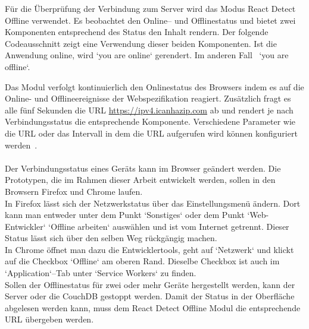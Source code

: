 Für die Überprüfung der Verbindung zum Server wird das Modus React Detect Offline verwendet. Es beobachtet den Online-- und Offlinestatus und bietet zwei Komponenten entsprechend des Status den Inhalt rendern. Der folgende Codeausschnitt zeigt eine Verwendung dieser beiden Komponenten. Ist die Anwendung online, wird `you are online` gerendert. Im anderen Fall ~`you are offline`.
%
\begin{center}

\end{center}
%
Das Modul verfolgt kontinuierlich den Onlinestatus des Browsers indem es auf die Online- und Offlineereignisse der Webspezifikation reagiert. Zusätzlich fragt es alle fünf Sekunden die URL \url{https://ipv4.icanhazip.com} ab und rendert je nach Verbindungsstatus die entsprechende Komponente. Verschiedene Parameter wie die URL oder das Intervall in dem die URL aufgerufen wird können konfiguriert werden~\cite{react-detect}. \\\\
%
Der Verbindungsstatus eines Geräts kann im Browser geändert werden. Die Prototypen, die im Rahmen dieser Arbeit entwickelt werden, sollen in den Browsern Firefox und Chrome laufen.\\
In Firefox lässt sich der Netzwerkstatus über das Einstellungsmenü ändern. Dort kann man entweder unter dem Punkt `Sonstiges` oder dem Punkt `Web-Entwickler` `Offline arbeiten` auswählen und ist vom Internet getrennt. Dieser Status lässt sich über den selben Weg rückgängig machen.\\
In Chrome öffnet man dazu die Entwicklertools, geht auf `Netzwerk` und klickt auf die Checkbox `Offline` am oberen Rand. Dieselbe Checkbox ist auch im `Application`--Tab unter `Service Workers` zu finden.\\
Sollen der Offlinestatus für zwei oder mehr Geräte hergestellt werden, kann der Server oder die CouchDB gestoppt werden. Damit der Status in der Oberfläche abgelesen werden kann, muss dem React Detect Offline Modul die entsprechende URL übergeben werden.